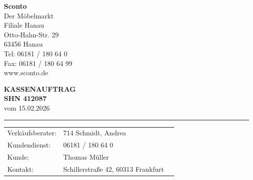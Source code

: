 \documentclass[a4paper,10pt]{article}
\begin{document}
\noindent
\begin{minipage}[t]{0.55\textwidth}
{\color{accent}\textbf{\Large Sconto}}\\
{\color{accent}\large Der M\"obelmarkt}\\[0.3cm]
{\small
Filiale Hanau\\
Otto-Hahn-Str. 29\\
63456 Hanau\\
Tel: 06181 / 180 64 0\\
Fax: 06181 / 180 64 99\\
www.sconto.de
}
\end{minipage}%
\hfill
\begin{minipage}[t]{0.4\textwidth}
\raggedleft
{\Large\textbf{KASSENAUFTRAG}}\\[0.3cm]
{\large\textbf{SHN 412087}}\\[0.5cm]
{\small vom 15.02.2026}
\end{minipage}

\vspace{0.5cm}
{\color{accent}\rule{\textwidth}{1pt}}
\vspace{0.3cm}

\noindent
{\small
\begin{tabularx}{\textwidth}{@{}lXl@{}}
Verk\"aufsberater: & 714 Schmidt, Andrea & \\
Kundendienst: & 06181 / 180 64 0 & \\
Kunde: & Thomas M\"uller & \\
Kontakt: & Schillerstra\ss e 42, 60313 Frankfurt & \\
\end{tabularx}
}

\vspace{0.3cm}

\noindent
{}

\vspace{0.5cm}
\end{document}
